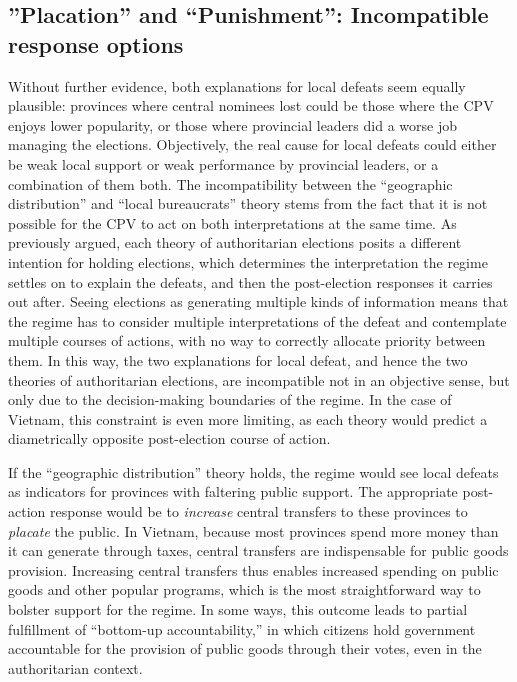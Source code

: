 \documentclass[12pt]{article}\usepackage[]{graphicx}\usepackage[]{color}
\newcommand{\1}{\mathbbm{1}}
\begin{document}
\subsection{''Placation'' and ``Punishment'': Incompatible response options}
\label{sec:vs}
Without further evidence, both explanations for local defeats seem equally plausible: provinces where central nominees lost could be those where the CPV enjoys lower popularity, or those where provincial leaders did a worse job managing the elections. Objectively, the real cause for local defeats could either be weak local support or weak performance by provincial leaders, or a combination of them both. The incompatibility between the ``geographic distribution'' and ``local bureaucrats'' theory stems from the fact that it is not possible for the CPV to act on both interpretations at the same time. As previously argued, each theory of authoritarian elections posits a different intention for holding elections, which determines the interpretation the regime settles on to explain the defeats, and then the post-election responses it carries out after. Seeing elections as generating multiple kinds of information means that the regime has to consider multiple interpretations of the defeat and contemplate multiple courses of actions, with no way to correctly allocate priority between them.  In this way, the two explanations for local defeat, and hence the two theories of authoritarian elections, are incompatible not in an objective sense, but only due to the decision-making boundaries of the regime. In the case of Vietnam, this constraint is even more limiting, as each theory would predict a diametrically opposite post-election course of action.

If the ``geographic distribution'' theory holds, the regime would see local defeats as indicators for provinces with faltering public support. The appropriate post-action response would be to  \textit{increase} central transfers to these provinces to \textit{placate} the public. In Vietnam, because most provinces spend more money than it can generate through taxes, central transfers are indispensable for public goods provision. Increasing central transfers thus enables increased spending on public goods and other popular programs, which is the most straightforward way to bolster support for the regime. In some ways, this outcome leads to partial fulfillment of ``bottom-up accountability,'' in which citizens hold government accountable for the provision of public goods through their votes, even in the authoritarian context.
\end{document}
